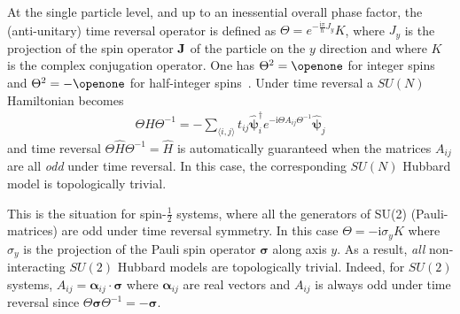 \documentclass[aps,pra,showpacs,twocolumn,superscriptaddress]{revtex4-1}
\newcommand{\imag}{\mathrm{i}}
\begin{document}
At the single particle level, and up to an inessential overall phase factor, 
the (anti-unitary) time reversal operator is defined as 
${\Theta = e^{-\frac{\imag\pi}{\hbar}J_y}K}$, where $J_y$ is the 
projection of the spin operator ${\bf J}$ of the particle on the $y$ direction and where $K$ is
the complex conjugation operator. One has $\Theta^2=\openone$ for integer spins and $\Theta^2= - \openone$ for
half-integer spins~\cite{Sakurai1986}.  Under time reversal a $SU(N)$ Hamiltonian becomes~\cite{Bernevig2013} 
\begin{align*}
	\Theta \hat{H} \Theta^{-1}= - \sum_{\langle i,j\rangle} t_{ij} 
	\hat{\bm{\psi}}_{i}^{\dagger}e^{-\imag \Theta A_{ij} \Theta^{-1}} \hat{\bm{\psi}}_{j}  
\end{align*} 
and time reversal $\Theta \hat{H} \Theta^{-1}= \hat{H}$ 
is automatically guaranteed when the matrices $A_{ij}$ are all 
{\it odd} under time reversal. In this case, the corresponding $SU(N)$ Hubbard model is topologically trivial. 

This is the situation for spin-$\frac{1}{2}$ systems, where all the generators of SU(2) (Pauli-matrices) 
are odd under time reversal symmetry. In this case $\Theta=-\imag \sigma_yK$ where $\sigma_y$ 
is the projection of the Pauli spin operator $\boldsymbol{\sigma}$ along axis $y$. 
As a result, {\it all} non-interacting $SU(2)$ Hubbard models are topologically trivial. 
Indeed, for $SU(2)$ systems, $A_{ij} = \bm{\alpha}_{ij} \cdot \boldsymbol{\sigma}$ where $\bm{\alpha}_{ij}$ 
are real vectors and $A_{ij} $ is always odd under 
time reversal since $\Theta \boldsymbol{\sigma} \Theta^{-1}= - \boldsymbol{\sigma}$.
\end{document}
